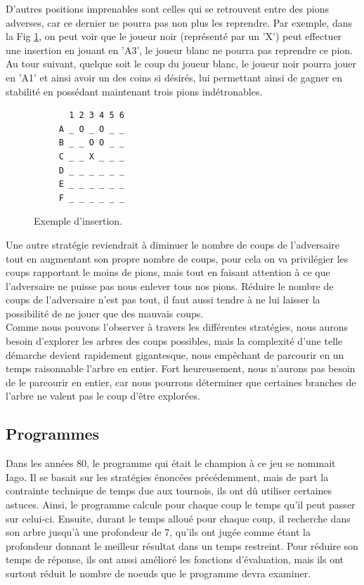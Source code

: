 \documentclass[10pt,a4paper]{article}
\begin{document}
D'autres positions imprenables sont celles qui se retrouvent entre des pions adverses, car ce dernier ne pourra pas non plus les reprendre. Par exemple, dans la Fig \ref{fig:exemple_insertion}, on peut voir que le joueur noir (représenté par un 'X') peut effectuer une insertion en jouant en 'A3', le joueur blanc ne pourra pas reprendre ce pion. Au tour suivant, quelque soit le coup du joueur blanc, le joueur noir pourra jouer en 'A1' et ainsi avoir un des coins si désirés, lui permettant ainsi de gagner en stabilité en possédant maintenant trois pions indétronables.
 \begin{figure}[H]    
    \centering
    \begin{BVerbatim}
       1 2 3 4 5 6
     A _ O _ O _ _
     B _ _ O O _ _
     C _ _ X _ _ _
     D _ _ _ _ _ _
     E _ _ _ _ _ _
     F _ _ _ _ _ _ 
    \end{BVerbatim}
    \caption {Exemple d'insertion.\label{fig:exemple_insertion}}
    \end{figure}
Une autre stratégie reviendrait à diminuer le nombre de coups de l'adversaire tout en augmentant son propre nombre de coups, pour cela on va privilégier les coups rapportant le moins de pions, mais tout en faisant attention à ce que l'adversaire ne puisse pas nous enlever tous nos pions. Réduire le nombre de coups de l'adversaire n'est pas tout, il faut aussi tendre à ne lui laisser la possibilité de ne jouer que des mauvais coups.\\

Comme nous pouvons l'observer à travers les différentes stratégies, nous aurons besoin d'explorer les arbres des coups possibles, mais la complexité d'une telle démarche devient rapidement gigantesque, nous empêchant de parcourir en un temps raisonnable l'arbre en entier. Fort heureusement, nous n'aurons pas besoin de le parcourir en entier, car nous pourrons déterminer que certaines branches de l'arbre ne valent pas le coup d'être explorées.
\subsection{Programmes}
Dans les années 80, le programme qui était le champion à ce jeu se nommait Iago. Il se basait sur les stratégies énoncées précédemment, mais de part la contrainte technique de temps due aux tournois, ils ont dû utiliser certaines astuces. Ainsi, le programme calcule pour chaque coup le temps qu'il peut passer sur celui-ci. Ensuite, durant le temps alloué pour chaque coup, il recherche dans son arbre jusqu'à une profondeur de 7, qu'ils ont jugée comme étant la profondeur donnant le meilleur résultat dans un temps restreint. Pour réduire son temps de réponse, ils ont aussi amélioré les fonctions d'évaluation, mais ils ont surtout réduit le nombre de noeuds que le programme devra examiner.
\newpage
\end{document}
